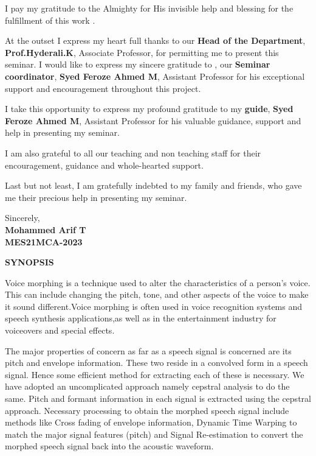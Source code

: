 \documentclass[12pt]{report}
\begin{document}
I pay my gratitude to the Almighty for His invisible help and blessing for the fulfillment of this work .

At the outset I express my heart full thanks to our \textbf{Head of the Department}, \textbf{Prof.Hyderali.K}, Associate Professor, for permitting me to present this seminar.
I would like to express my sincere gratitude to , our \textbf{Seminar coordinator}, \textbf {Syed Feroze Ahmed M}, Assistant Professor for his exceptional support and encouragement throughout this project.

I take this opportunity to express my profound gratitude to my \textbf{guide}, \textbf{Syed Feroze Ahmed M}, Assistant Professor for his valuable guidance,  support and help in presenting my seminar.

I am also grateful to all our teaching and non teaching staff for their encouragement, guidance and whole-hearted support.

Last but not least, I am gratefully indebted to my family and friends, who gave me their precious help in presenting my seminar.
\endgroup
\vspace{3cm}

\begin{flushright}
Sincerely, \\
\textbf{Mohammed Arif T \\
MES21MCA-2023}\\
\end{flushright}

\newpage
{\LARGE\bfseries\centering SYNOPSIS \par}
 \vspace{1cm}
\thispagestyle{empty}

Voice morphing is a technique used to alter the characteristics of a person's voice. This can include 
changing the pitch, tone, and other aspects of the voice to make it sound different.Voice morphing is 
often used in voice recognition systems and speech synthesis applications,as well as in the entertainment 
industry for voiceovers and special effects.
\newline

The major properties of concern as far as a speech signal is 
concerned are its pitch and envelope information. These two reside in a convolved form in a speech 
signal. Hence some efficient method for extracting each of these is necessary. We have adopted an 
uncomplicated approach namely cepstral analysis to do the same. Pitch and formant information in each 
signal is extracted using the cepstral approach. Necessary processing to obtain the morphed speech signal 
include methods like Cross fading of envelope information, Dynamic Time Warping to match the major 
signal features (pitch) and Signal Re-estimation to convert the morphed speech signal back into the 
acoustic waveform.
\newline
\end{document}
